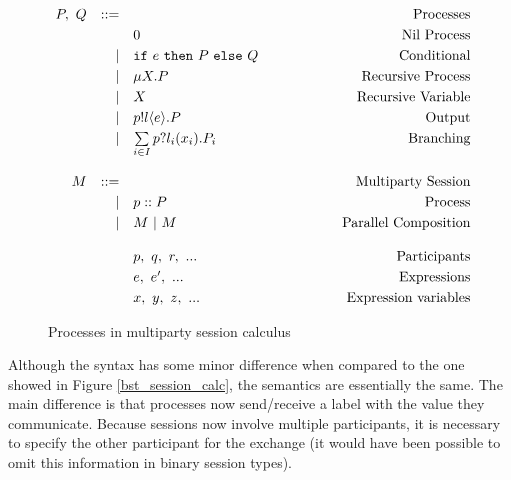 \documentclass[12pt,twoside]{report}
\newcommand{\white}{\ \ \ \ \ \ \ \ \ \ \ \ }
\begin{document}
\begin{figure}[h]
    \centering
    \begin{equation*}
    \centering
    \begin{array}{rrlcr}
        P,\ Q & ::= && \white & \text{Processes} \\[2.75pt]
             &   & 0 & \white & \text{Nil\ Process}  \\[2.75pt]
             
             & | & \texttt{if}\ e\ \texttt{then}\ P\ \texttt{else}\ Q & \white & \text{Conditional} \\[2.75pt]
             & | & \mu X.P & \white  & \text{Recursive}\ \text{Process} \\[2.75pt]
             & | & X & \white  & \text{Recursive\ Variable}\\[2.75pt]
             & | & p!l \langle e \rangle.P & \white & \text{Output} \\[2.75pt]
             & | & \sum\limits_{i \in I} p?l_i(x_i).P_i & \white & \text{Branching} \\\\

        M & ::= &&& \text{Multiparty\ Session}\\[2.75pt]
        & | & p :: P\ & \white & \text{Process}\\[2.75pt]
        & | & M\ |\ M\ & \white & \text{Parallel\ Composition}\\\\
        
        &&p,\ q,\ r,\ ... & \white & \text{Participants}\\[2.75pt]
        &&e,\ e',\ ... & \white & \text{Expressions}\\[2.75pt]
        &&x,\ y,\ z,\ ... & \white & \text{Expression\  variables}
        \end{array}
    \end{equation*}
    \caption{Processes in multiparty session calculus}
    \label{MPST_processes}
\end{figure}{}

Although the syntax has some minor difference when compared to the one showed in Figure \ref{bst_session_calc}, the semantics are essentially the same. The main difference is that processes now send/receive a label with the value they communicate. Because sessions now involve multiple participants, it is necessary to specify the other participant for the exchange (it would have been possible to omit this information in binary session types). \\
\end{document}
